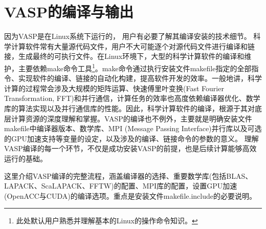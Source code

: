 \chapter{\rm{VASP}的编译与输出}
因为\textrm{VASP}是在\textrm{Linux}系统下运行的，
用户有必要了解其编译安装的技术细节。%
科学计算软件常有大量源代码文件，用户不大可能逐个对源代码文件进行编译和链接，生成最终的可执行文件。在\textrm{Linux}环境下，大型的科学计算软件的编译和维护，主要依赖\textrm{make}命令工具\footnote{此处默认用户熟悉并理解基本的\textrm{Linux}的操作命令知识。}。\textrm{make}命令通过执行安装文件\textrm{makefile}指定的全部指令、实现软件的编译、链接的自动化构建，提高软件开发的效率。一般地讲，科学计算的过程常会涉及大规模的矩阵运算、快速傅里叶变换\textrm{(Fast Fourier Transformation, FFT)}和并行通信，计算任务的效率也高度依赖编译器优化、数学库的算法实现以及并行通信库的性能。因此，科学计算软件的编译，根源于其对底层计算资源的深度理解和掌握。\textrm{VASP}的编译也不例外，主要就是明确安装文件\textrm{makefile}中编译器版本、数学库、\textrm{MPI (Message Passing Interface)}并行库以及可选的\textrm{GPU}加速支持等变量的设定，以及涉及的编译、链接命令的参数的意义。%
理解\textrm{VASP}编译的每一个环节，不仅是成功安装\textrm{VASP}的前提，也是后续计算能够高效运行的基础。

这里介绍\textrm{VASP}编译的完整流程，涵盖编译器的选择、重要数学库(包括\textrm{BLAS}、\textrm{LAPACK}、\textrm{ScaLAPACK}、\textrm{FFTW})的配置、\textrm{MPI}库的配置，设置\textrm{GPU}加速(\textrm{OpenACC}与\textrm{CUDA})的编译选项。重点是安装文件\textrm{makefile.include}的必要说明。%

